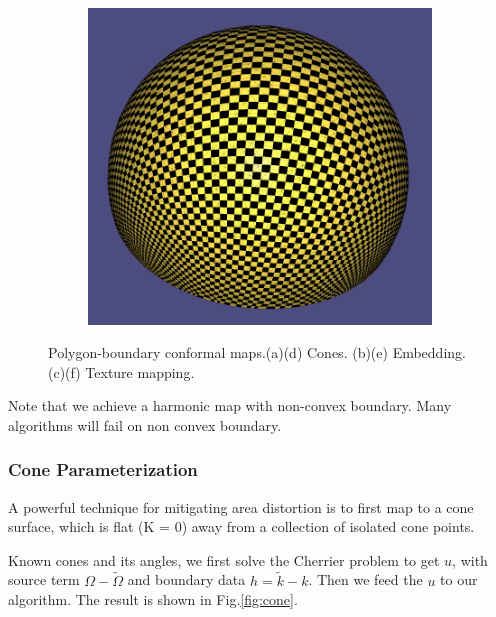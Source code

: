 \begin{figure}
\begin{subfigure}{0.25\textwidth}
\caption{}
\end{subfigure}\ \ \ \ \ \ \ \ \ \ \ \ \
\begin{subfigure}{0.25\textwidth}
\includegraphics[height = \textwidth]{images/halfshpere_polygon_texture}
\caption{}
\end{subfigure}
\caption{Polygon-boundary conformal maps.(a)(d) Cones. (b)(e) Embedding. (c)(f) Texture mapping.}
\label{fig:polygon}
\end{figure}
Note that we achieve a harmonic map with non-convex boundary. Many algorithms will fail on non convex boundary.


\subsubsection{Cone Parameterization}
A powerful technique for mitigating area distortion is to first map to a cone surface, which is flat (K = 0) away from a collection of isolated cone points.

Known cones and its angles, we first solve the Cherrier problem to get $u$, with source term $\Omega - \tilde{\Omega}$  and boundary data $h = \tilde{k} - k$. Then we feed the $u$ to our algorithm. The result is shown in Fig.\ref{fig:cone}.

